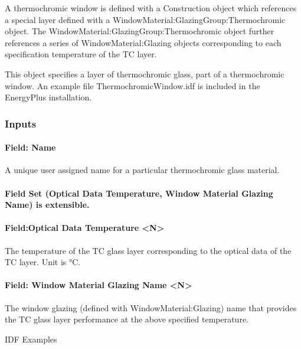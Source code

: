 A thermochromic window is defined with a Construction object which references a special layer defined with a WindowMaterial:GlazingGroup:Thermochromic object. The WindowMaterial:GlazingGroup:Thermochromic object further references a series of WindowMaterial:Glazing objects corresponding to each specification temperature of the TC layer.

This object specifies a layer of thermochromic glass, part of a thermochromic window. An example file ThermochromicWindow.idf is included in the EnergyPlus installation.

\subsubsection{Inputs}\label{inputs-15-015}

\paragraph{Field: Name}\label{field-name-9-017}

A unique user assigned name for a particular thermochromic glass material.

\paragraph{Field Set (Optical Data Temperature, Window Material Glazing Name) is extensible.}\label{field-set-optical-data-temperature-window-material-glazing-name-is-extensible.}

\paragraph{Field:Optical Data Temperature \textless{}N\textgreater{}}\label{fieldoptical-data-temperature-n}

The temperature of the TC glass layer corresponding to the optical data of the TC layer. Unit is °C.

\paragraph{Field: Window Material Glazing Name \textless{}N\textgreater{}}\label{field-window-material-glazing-name-n}

The window glazing (defined with WindowMaterial:Glazing) name that provides the TC glass layer performance at the above specified temperature.

IDF Examples

